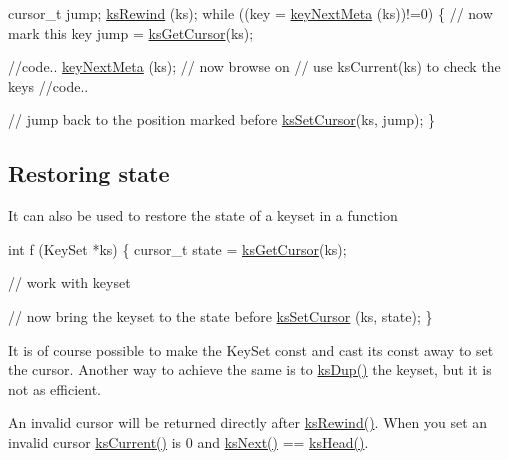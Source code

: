 \begin{DoxyCode}
cursor\_t jump;
\hyperlink{group__keyset_gabe793ff51f1728e3429c84a8a9086b70}{ksRewind} (ks);
\textcolor{keywordflow}{while} ((key = \hyperlink{group__keymeta_ga4c88342f580a4291455a801af71ce048}{keyNextMeta} (ks))!=0)
\{
        \textcolor{comment}{// now mark this key}
        jump = \hyperlink{group__keyset_gaffe507ab9281c322eb16c3e992075d29}{ksGetCursor}(ks);

        \textcolor{comment}{//code..}
        \hyperlink{group__keymeta_ga4c88342f580a4291455a801af71ce048}{keyNextMeta} (ks); \textcolor{comment}{// now browse on}
        \textcolor{comment}{// use ksCurrent(ks) to check the keys}
        \textcolor{comment}{//code..}

        \textcolor{comment}{// jump back to the position marked before}
        \hyperlink{group__keyset_gad94c9ffaa3e8034564c0712fd407c345}{ksSetCursor}(ks, jump);
\}
\end{DoxyCode}
\hypertarget{group__keyset_restore}{}\subsection{Restoring state}\label{group__keyset_restore}
It can also be used to restore the state of a keyset in a function


\begin{DoxyCode}
\textcolor{keywordtype}{int} f (KeySet *ks)
\{
        cursor\_t state = \hyperlink{group__keyset_gaffe507ab9281c322eb16c3e992075d29}{ksGetCursor}(ks);

        \textcolor{comment}{// work with keyset}

        \textcolor{comment}{// now bring the keyset to the state before}
        \hyperlink{group__keyset_gad94c9ffaa3e8034564c0712fd407c345}{ksSetCursor} (ks, state);
\}
\end{DoxyCode}


It is of course possible to make the Key\+Set const and cast its const away to set the cursor. Another way to achieve the same is to \hyperlink{group__keyset_gac59e4b328245463f1451f68d5106151c}{ks\+Dup()} the keyset, but it is not as efficient.

An invalid cursor will be returned directly after \hyperlink{group__keyset_gabe793ff51f1728e3429c84a8a9086b70}{ks\+Rewind()}. When you set an invalid cursor \hyperlink{group__keyset_ga4287b9416912c5f2ab9c195cb74fb094}{ks\+Current()} is 0 and \hyperlink{group__keyset_ga317321c9065b5a4b3e33fe1c399bcec9}{ks\+Next()} == \hyperlink{group__keyset_gae7dbf3aef70e67b5328475eb3d1f92f5}{ks\+Head()}.

